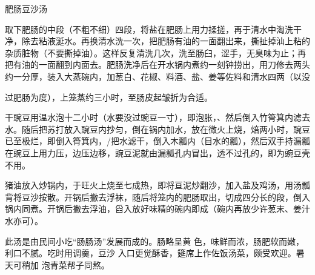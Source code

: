 \begin{recipe}{肥肠豆沙汤}

\ingredients




\cooking

\step 取下肥肠的中段（不粗不细）四段，将盐在肥肠上用力揉搓，再于清水中淘洗干净，除去粘液涎水。再换清水洗一次，把肥肠有油的一面翻出来，撕扯掉汕上粘的杂质脏物（不要撕掉油）。这样反复清洗几次，洗至肠臼，涩手，无臭味为止；再把有油的一面翻到内面去。肥肠洗净后在开水锅内煮约一刻钟捞出，用刀修去两头约一分厚，装入大蒸碗内，加葱白、花椒、料酒、盐、姜等佐料和清水四两（以没

过肥肠为度），上笼蒸约三小时，至肠皮起皱折为合适。

\step 干豌豆用温水泡十二小时（水要没过豌豆一寸），即泡胀，、然后倒入竹筲箕内滤去水。随后把苏打放入豌豆内抄匀，倒在锅内加水，放在微火上烧，焙两小时，豌豆已至极烂，即倒入筲箕内，/把水滤干，倒入木瓢内（目水的瓢），然后双手持漏瓢在豌豆上用力压，边压边移，豌豆泥就由漏瓢孔内冒出，透不过孔的，即为豌豆壳不用。

\step 猪油放入炒锅内，于旺火上烧至七成热，即将亘泥炒翻沙，加入盐及鸡汤，用汤瓢背将豆沙按散。开锅后撇去浮袜，随后将笼内的肥肠取出，切成四分长的段，倒入锅内同煮。开锅后撇去浮油，舀入放好味精的碗内即成（碗内再放少许葱末、姜汁水亦可）。

\notes

此汤是由民间小吃“肠肠汤”发展而成的。肠略呈黄 色，味鲜而浓，肠肥软而嫩，利口不腻。吃时用调羹，豆沙 入口更觉酥香，筵席上作佐饭汤菜，颇受欢迎。暑天可稍加 泡青菜帮子同熬。

\end{recipe}

